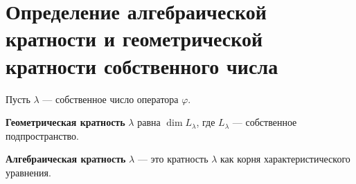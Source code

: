 \section{Определение алгебраической кратности и геометрической кратности собственного числа}

\begin{definition}
Пусть $\lambda$ --- собственное число оператора $\varphi$.

\textbf{Геометрическая кратность} $\lambda$ равна $\dim L_\lambda$, где $L_\lambda$ --- собственное подпространство.

\textbf{Алгебраическая кратность} $\lambda$ --- это кратность $\lambda$ как корня характеристического уравнения.
\end{definition}

